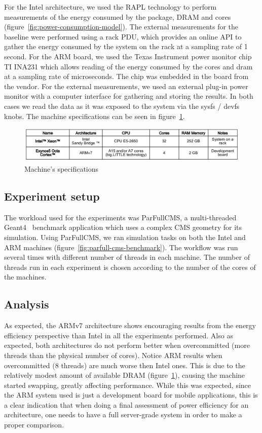 For the Intel architecture, we used the RAPL technology to perform measurements
of the energy consumed by the package, DRAM and cores 
(figure~\ref{fig:power-consumption-model}).
The external measurements for the baseline were performed using a
rack PDU, which provides an online API to gather the energy consumed
by the system on the rack at a sampling rate of 1 second.
For the ARM board, we used the Texas Instrument power monitor
chip TI INA231 which allows reading of the energy consumed by the
cores and dram at a sampling rate of microseconds. The chip was
embedded in the board from the vendor. For the external measurements,
we used an external plug-in power monitor with a computer interface
for gathering and storing the results.
In both cases we read the data as it was exposed to the system via
the sysfs / devfs knobs.
The machine specifications can be seen in figure~\ref{figure:machine-specs}.


\begin{figure}[ht!]
\centering
\includegraphics[width=150mm]{img/table.png}
\caption{Machine's specifications}
\label{figure:machine-specs}
\end{figure}


\subsection{Experiment setup}

The workload used for the experiments was ParFullCMS, a multi-threaded
Geant4~\cite{GEANT4} benchmark application which uses a complex CMS
geometry for its simulation. Using ParFullCMS, we ran simulation
tasks on both the Intel and ARM machines 
(figure~\ref{fig:parfull-cms-benchmark}).  The workflow was run several times
with different number of threads in each machine. The number of
threads run in each experiment is chosen according to the number of
the cores of the machines.

\subsection{Analysis}

As expected, the ARMv7 architecture shows encouraging results from
the energy efficiency perspective than Intel in all the experiments
performed. Also as expected, both architectures do not perform
better when overcommitted (more threads than the physical number
of cores).  Notice ARM results when overcommitted
(8 threads) are much worse then Intel ones. This is due to the relatively 
modest amount of available DRAM (figure~\ref{figure:machine-specs}), causing 
the machine started swapping,
greatly affecting performance. While this was expected, since the
ARM system used is just a development board for mobile applications,
this is a clear indication that when doing a final assessment of
power efficiency for an architecture, one needs to have a full 
server-grade system in order to make a proper comparison.

